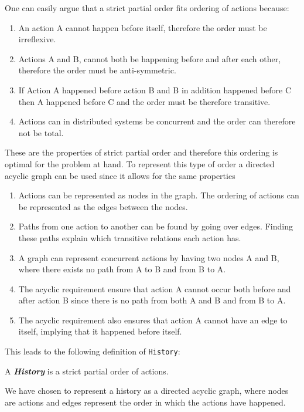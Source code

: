 	\newpar One can easily argue that a strict partial order fits ordering of actions because:
	\begin{enumerate}
		\item An action A cannot happen before itself, therefore the order must be irreflexive.
		\item Actions A and B, cannot both be happening before and after each other, therefore the order must be anti-symmetric.
		\item If Action A happened before action B and B in addition happened before C then A happened before C and the order must be therefore transitive.
		\item Actions can in distributed systems be concurrent and the order can therefore not be total.
	\end{enumerate}
	\newpar These are the properties of strict partial order and therefore this ordering is optimal for the problem at hand. To represent this type of order a directed acyclic graph can be used since it allows for the same properties
	\begin{enumerate}
		\item Actions can be represented as nodes in the graph. The ordering of actions can be represented as the edges between the nodes.
		\item Paths from one action to another can be found by going over edges. Finding these paths explain which transitive relations each action has.
		\item A graph can represent concurrent actions by having two nodes A and B, where there exists no path from A to B and from B to A.
		\item The acyclic requirement ensure that action A cannot occur both before and after action B since there is no path from both A and B and from B to A.
		\item The acyclic requirement also ensures that action A cannot have an edge to itself, implying that it happened before itself.
	\end{enumerate}
	
	\newpar This leads to the following definition of \texttt{History}:
	
	\begin{definition}
		A \textit{\textbf{History}} is a strict partial order of actions.
	\end{definition}
	
	\newpar
	We have chosen to represent a history as a directed acyclic graph, where nodes are actions and edges represent the order in which the actions have happened.
	
